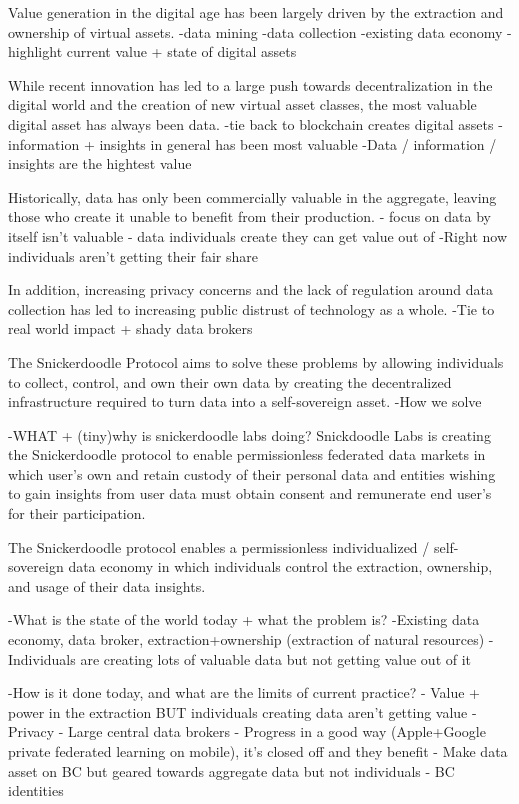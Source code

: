 Value generation in the digital age has been largely driven by the extraction and ownership of virtual assets. 
        -data mining
        -data collection
        -existing data economy
-highlight current value + state of digital assets

While recent innovation has led to a large push towards decentralization in the digital world and the creation of new virtual asset classes, the most valuable digital asset has always been data.
        -tie back to blockchain creates digital assets 
        - information + insights in general has been most valuable 
-Data / information / insights are the hightest value

Historically, data has only been commercially valuable in the aggregate, leaving those who create it unable to benefit from their production.
        - focus on data by itself isn't valuable
        - data individuals create they can get value out of
-Right now individuals aren't getting their fair share

In addition, increasing privacy concerns and the lack of regulation around data collection has led to increasing public distrust of technology as a whole. 
-Tie to real world impact + shady data brokers 

The Snickerdoodle Protocol aims to solve these problems by allowing individuals to collect, control, and own their own data by creating the decentralized infrastructure required to turn data into a self-sovereign asset.
-How we solve


-WHAT + (tiny)why is snickerdoodle labs doing?
Snickdoodle Labs is creating the Snickerdoodle protocol to enable permissionless federated data markets in which user's own and retain custody of their personal data and entities wishing to gain insights from user data must obtain consent and remunerate end user's for their participation.

The Snickerdoodle protocol enables a permissionless individualized / self-sovereign data economy in which individuals control the extraction, ownership, and usage of their data insights.

-What is the state of the world today + what the problem is?
     -Existing data economy, data broker, extraction+ownership (extraction of natural resources)
     -Individuals are creating lots of valuable data but not getting value out of it

-How is it done today, and what are the limits of current practice?
    - Value + power in the extraction BUT individuals creating data aren't getting value
    - Privacy
    - Large central data brokers
    - Progress in a good way (Apple+Google private federated learning on mobile), it's closed off and they benefit
    - Make data asset on BC but geared towards aggregate data but not individuals
    - BC identities

